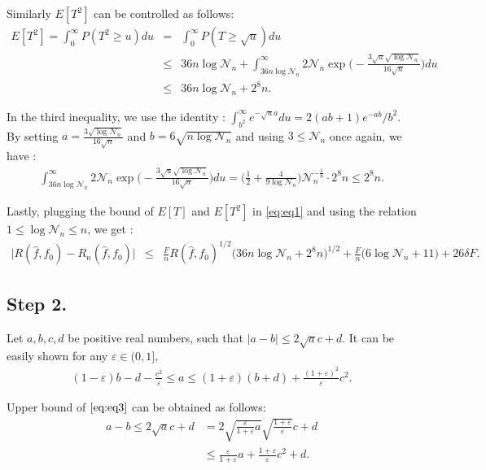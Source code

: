 \documentclass{article}
\theoremstyle{definition}
\begin{document}
Similarly $E[T^{2}]$ can be controlled as follows:
\begin{eqnarray*}
    E[T^{2}] = \int_{0}^{\infty}P(T^2 \geq u) du &=& \int_{0}^{\infty}P(T \geq \sqrt{u}) du \\
    &\leq& 36n\log\mathcal{N}_{n} + \int_{36n\log\mathcal{N}_{n}}^{\infty}2\mathcal{N}_n \exp\bigg( -\frac{3\sqrt{u}\sqrt{\log\mathcal{N}_{n}}}{16\sqrt{n}} \bigg) du\\
    &\leq& 36n\log\mathcal{N}_{n} + 2^{8}n.
\end{eqnarray*}

In the third inequality, we use the identity : $\int_{b^{2}}^{\infty}e^{-\sqrt{u}a}du=2(ab+1)e^{-ab}/b^{2}$.
By setting $a=\frac{3\sqrt{\log\mathcal{N}_{n}}}{16\sqrt{n}}$ and $b=6\sqrt{n\log\mathcal{N}_n}$ and using $3\leq\mathcal{N}_{n}$ once again, we have : 
\begin{eqnarray*}
    \int_{36n\log\mathcal{N}_{n}}^{\infty}2\mathcal{N}_n \exp\bigg( -\frac{3\sqrt{u}\sqrt{\log\mathcal{N}_{n}}}{16\sqrt{n}} \bigg) du=
    \bigg( \frac{1}{2} + \frac{4}{9\log\mathcal{N}_{n}} \bigg)\mathcal{N}_{n}^{-\frac{1}{8}}\cdot2^{8}n\leq 2^{8}n. 
\end{eqnarray*}

Lastly, plugging the bound of $E[T]$ and $E[T^{2}]$ in \eqref{eq:eq1} and using the relation $1\leq \log\mathcal{N}_{n} \leq n$, we get :
\begin{eqnarray} \label{eq:eq2}
    \bigg| R(\widehat{f},f_{0})-R_n(\widehat{f},f_{0}) \bigg|
    &\leq& \frac{F}{n}R(\widehat{f},f_{0})^{1/2}\big( 36n\log\mathcal{N}_{n}+2^{8}n \big)^{1/2} + \frac{F}{n}\big( 6\log\mathcal{N}_{n} + 11 \big) + 26\delta F.
\end{eqnarray}

\subsection{Step 2.}
Let $a,b,c,d$ be positive real numbers, such that $|a-b|\leq 2\sqrt{a}c+d$. It can be easily shown for any $\varepsilon\in(0,1]$,
\begin{eqnarray} \label{eq:eq3}
    (1-\varepsilon)b-d-\frac{c^2}{\varepsilon}
    \leq a \leq (1+\varepsilon)(b+d)+\frac{(1+\varepsilon)^{2}}{\varepsilon}c^2.
\end{eqnarray}

Upper bound of $\eqref{eq:eq3}$ can be obtained as follows:
\begin{align*}
    a-b \leq 2\sqrt{a}c+d &= 2\sqrt{\frac{\varepsilon}{1+\varepsilon}a}\sqrt{\frac{1+\varepsilon}{\varepsilon}}c+d \\
    &\leq \frac{\varepsilon}{1+\varepsilon}a + \frac{1+\varepsilon}{\varepsilon}c^{2}+d.
\end{align*}
\end{document}
